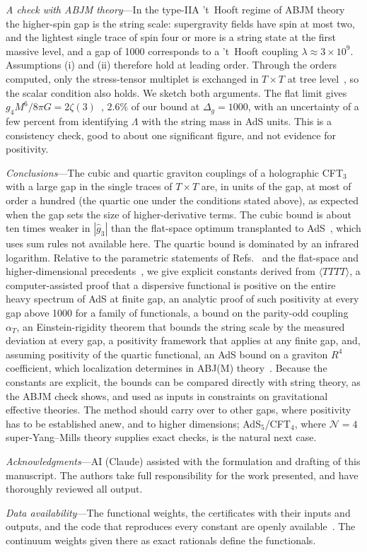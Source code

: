 \documentclass[aps,prl,twocolumn,superscriptaddress,nofootinbib,floatfix]{revtex4-2}
\begin{document}
\textit{A check with ABJM theory}---In the type-IIA 't~Hooft regime of ABJM theory~\cite{ABJM} the higher-spin
gap is the string scale: supergravity fields have spin at most two, and the lightest single trace of spin four
or more is a string state at the first massive level, and a gap of 1000 corresponds to a 't~Hooft coupling $\lambda\approx3\times10^9$. Assumptions (i) and (ii) therefore hold at leading order.
Through the orders computed, only the stress-tensor multiplet is exchanged in $T\times T$ at tree
level~\cite{CPY,BCP}, so the scalar condition also holds. We sketch both arguments. The flat limit gives
$g_4M^6/8\pi G=2\zeta(3)$~\cite{CHMRSswamp,BCP}, $2.6\%$ of our bound at $\Delta_g=1000$, with an uncertainty of
a few percent from identifying $\Lambda$ with the string mass in AdS units. This is a consistency check, good to about one significant
figure, and not evidence for positivity.

\textit{Conclusions}---The cubic and quartic graviton couplings of a holographic CFT$_3$ with a large gap in the
single traces of $T\times T$ are, in units of the gap, at most of order a hundred (the quartic one under the conditions stated above), as expected when the gap sets
the size of higher-derivative terms. The cubic bound is about ten times weaker in $|\hat g_3|$ than the flat-space
optimum transplanted to AdS~\cite{CHLPS}, which uses sum rules not available here. The quartic bound is
dominated by an infrared logarithm. Relative to the parametric statements of Refs.~\cite{KKSDZ,BHM,AKT} and the
flat-space and higher-dimensional precedents~\cite{CHLPS,CHLPSpw}, we give explicit constants derived from $\langle TTTT\rangle$, a computer-assisted proof that a dispersive functional is positive on the entire heavy spectrum of AdS at finite gap, an analytic proof of such positivity at every gap above 1000 for a family of functionals, a bound on the parity-odd coupling $\alpha_T$, an Einstein-rigidity theorem that bounds the string scale by the measured deviation at every gap, a positivity framework that applies at any finite gap, and, assuming positivity of the quartic functional, an
AdS bound on a graviton $R^4$ coefficient, which localization determines in ABJ(M) theory~\cite{BCP,BCJP}. Because the constants are explicit, the bounds can be compared directly with string theory, as the ABJM check
shows, and used as inputs in constraints on gravitational effective theories. The method should carry over to other gaps, where positivity has to be established anew, and to higher dimensions; AdS$_5$/CFT$_4$, where $\mathcal N=4$ super-Yang--Mills theory supplies exact checks, is the natural
next case.

\textit{Acknowledgments}---AI (Claude) assisted with the formulation and drafting of this manuscript. The authors take full
responsibility for the work presented, and have thoroughly reviewed all output.

\textit{Data availability}---The functional weights, the certificates with their inputs and outputs, and the
code that reproduces every constant are openly available~\cite{Zenodo}. The continuum weights given there as exact rationals define the functionals.


\end{document}
